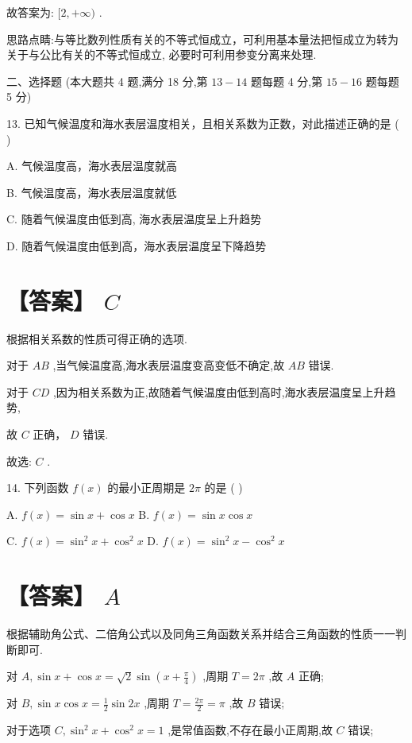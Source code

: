 \documentclass[10pt]{article}
\begin{document}
故答案为: \(\lbrack 2, + \infty )\) .

思路点睛:与等比数列性质有关的不等式恒成立，可利用基本量法把恒成立为转为关于与公比有关的不等式恒成立, 必要时可利用参变分离来处理.

二、选择题 (本大题共 4 题,满分 18 分,第 \({13} - {14}\) 题每题 4 分,第 \({15} - {16}\) 题每题 5 分)

13. 已知气候温度和海水表层温度相关，且相关系数为正数，对此描述正确的是 ( )

A. 气候温度高，海水表层温度就高

B. 气候温度高，海水表层温度就低

C. 随着气候温度由低到高, 海水表层温度呈上升趋势

D. 随着气候温度由低到高，海水表层温度呈下降趋势

\section*{【答案】 \(C\)}

根据相关系数的性质可得正确的选项.

对于 \({AB}\) ,当气候温度高,海水表层温度变高变低不确定,故 \({AB}\) 错误.

对于 \({CD}\) ,因为相关系数为正,故随着气候温度由低到高时,海水表层温度呈上升趋势,

故 \(C\) 正确， \(D\) 错误.

故选: \(C\) .

14. 下列函数 \(f\left( x\right)\) 的最小正周期是 \({2\pi }\) 的是 ( )

A. \(f\left( x\right)  = \sin x + \cos x\) B. \(f\left( x\right)  = \sin x\cos x\)

C. \(f\left( x\right)  = {\sin }^{2}x + {\cos }^{2}x\) D. \(f\left( x\right)  = {\sin }^{2}x - {\cos }^{2}x\)

\section*{【答案】 \(A\)}

根据辅助角公式、二倍角公式以及同角三角函数关系并结合三角函数的性质一一判断即可.

对 \(A,\sin x + \cos x = \sqrt{2}\sin \left( {x + \frac{\pi }{4}}\right)\) ,周期 \(T = {2\pi }\) ,故 \(A\) 正确;

对 \(B,\sin x\cos x = \frac{1}{2}\sin {2x}\) ,周期 \(T = \frac{2\pi }{2} = \pi\) ,故 \(B\) 错误;

对于选项 \(C,{\sin }^{2}x + {\cos }^{2}x = 1\) ,是常值函数,不存在最小正周期,故 \(C\) 错误;
\end{document}
